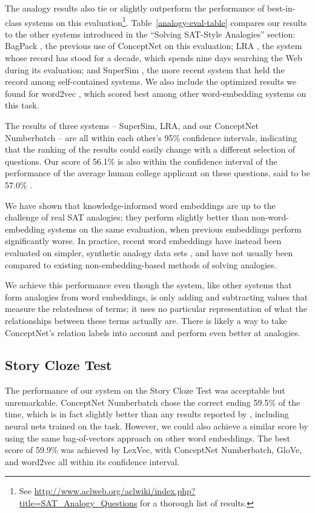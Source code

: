 \documentclass[letterpaper]{article}
\begin{document}
The analogy results also tie or slightly outperform the performance of
best-in-class systems on this evaluation\footnote{See
\url{http://www.aclweb.org/aclwiki/index.php?title=SAT_Analogy_Questions} for a
thorough list of results.}. Table~\ref{analogy-eval-table} compares our results
to the other systems introduced in the ``Solving SAT-Style Analogies'' section:
BagPack \cite{herdagdelen2009bagpack}, the previous use of ConceptNet on this
evaluation; LRA \cite{turney2006lra}, the system whose record has stood for a
decade, which spends nine days searching the Web during its evaluation; and
SuperSim \cite{turney2013supersim}, the more recent system that held the record
among self-contained systems. We also include the optimized results we found
for word2vec \cite{mikolov2013word2vec}, which scored best among other
word-embedding systems on this task.

The results of three systems -- SuperSim, LRA, and our ConceptNet Numberbatch
-- are all within each other's 95\% confidence intervals, indicating that the
ranking of the results could easily change with a different selection of
questions. Our score of 56.1\% is also within the confidence interval of the
performance of the average human college applicant on these questions, said to
be 57.0\% \cite{turney2006lra}.

We have shown that knowledge-informed word embeddings are up to the challenge
of real SAT analogies; they perform slightly better than non-word-embedding
systems on the same evaluation, when previous embeddings perform significantly
worse. In practice, recent word embeddings have instead been evaluated on
simpler, synthetic analogy data sets \cite{mikolov2013word2vec}, and have not
usually been compared to existing non-embedding-based methods of solving
analogies.

We achieve this performance even though the system, like other systems that
form analogies from word embeddings, is only adding and subtracting values that
measure the relatedness of terms; it uses no particular representation of what
the relationships between these terms actually are. There is likely a way to
take ConceptNet's relation labels into account and perform even better at
analogies.

\subsection{Story Cloze Test}

The performance of our system on the Story Cloze Test was acceptable but
unremarkable. ConceptNet Numberbatch chose the correct ending 59.5\% of the
time, which is in fact slightly better than any results reported by
\citeauthor{mostafazadeh2016cloze} , including
neural nets trained on the task. However, we could also achieve a similar score
by using the same bag-of-vectors approach on other word embeddings. The best
score of 59.9\% was achieved by LexVec, with ConceptNet Numberbatch, GloVe, and
word2vec all within its confidence interval.
\end{document}
